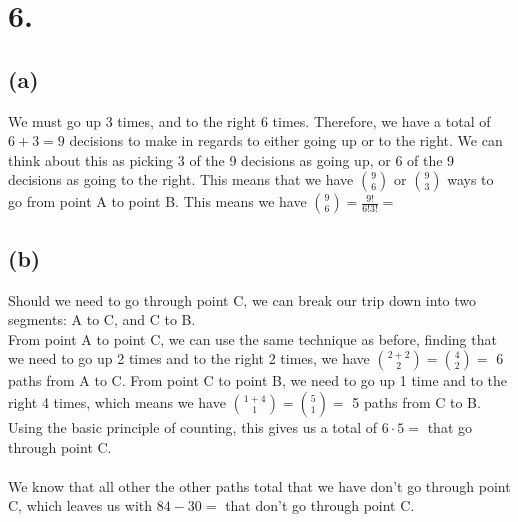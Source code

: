 \documentclass{article}
\begin{document}
\section*{6.}
{\Large 

\subsection*{(a)}

We must go up 3 times, and to the right 6 times. Therefore, we have a total of $6 + 3 = 9$ decisions to make in regards to either going up or to the right. We can think about this as picking 3 of the 9 decisions as going up, or 6 of the 9 decisions as going to the right. This means that we have $\binom{9}{6}$ or $\binom{9}{3}$ ways to go from point A to point B. This means we have $\binom{9}{6} = \frac{9!}{6!3!} = $ 

\subsection*{(b)}

Should we need to go through point C, we can break our trip down into two segments: A to C, and C to B. \\ 
From point A to point C, we can use the same technique as before, finding that we need to go up 2 times and to the right 2 times, we have $\binom{2+2}{2} = \binom{4}{2} = $ 6 paths from A to C. From point C to point B, we need to go up 1 time and to the right 4 times, which means we have $\binom{1 + 4}{1} = \binom{5}{1} = $ 5 paths from C to B. Using the basic principle of counting, this gives us a total of $6 \cdot 5 = $  that go through point C. \\ \\ 
We know that all other the other paths total that we have don't go through point C, which leaves us with $84 - 30 = $  that don't go through point C.

}
\end{document}
